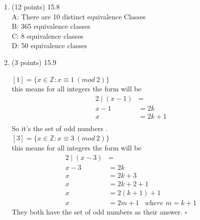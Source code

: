 \documentclass[12pt]{article}
\begin{document}
\begin{enumerate}
\item (12 points) 15.8 \\
A: There are 10 distinct equivalence Classes \\
B: 365 equivalence classes \\
C: 8 equivalence classes \\
D: 50 equivalence classes \\

\item (3 points) 15.9

$[1]=\{x \in \mathbb{Z}: x \equiv 1\ (mod\ 2)\}$\\
this means for all integers the form will be 
\[
\begin{aligned}
2\mid (x-1)&= \\
x-1&=2k\\
x&=2k+1\\
\end{aligned}
\]
So it's the set of odd numbers .\\

$[3]=\{x \in \mathbb{Z}: x \equiv 3\ (mod\ 2)\}$\\
this means for all integers the form will be 
\[
\begin{aligned}
2\mid (x-3)&= \\
x-3&=2k\\
x&=2k+3\\
x&=2k+2+1\\
x&=2(k+1)+1\\
x&=2m+1 \;\;\; \textit{where }m=k+1
\end{aligned}
\]
They both have the set of odd numbers as their answer. $\square$


\end{enumerate}
\end{document}
